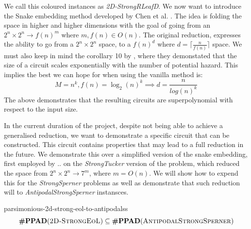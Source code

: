 We call this coloured instances as \textit{2D-StrongRLeafD}. We now want to introduce the Snake embedding method developed by
Chen et al. \cite{chen_SettlingComplexityComputing_2009}. The idea is folding the space in higher and higher dimensions
with the goal of going from an  $2^n \times 2^n \to f(n)^m$  where $m, f(n) \in O(n)$. The original reduction,
expresses the ability to go from a $2^n \times 2^n$ space, to a $f(n)^d$ where $d = \lceil \frac{n}{f(n)} \rceil$ space.
We must also keep in mind the corollary 10 by \cite{ikenmeyer_ComplexityHazardfreeCircuits_2019}, where they demonstated
that the size of a circuit scales exponentially with the number of potential hazard. This implies the best we can hope for
when using the vanilla method is:
$$
    M = n^k, f(n) = \log_2(n)^k \implies d = \frac{n}{log(n)^k}
$$
The above demonstrates that the resulting circuits are superpolynomial with respect to the input size.


In the current duration of the project, despite not being able to achieve a generalised reduction,
we want to demonstrate a specific circuit that can be constructed. This circuit contains properties
that may lead to a full reduction in the future. We demonstrate this over a simplified version
of the snake embedding, first employed by {..} %
on the \textit{StrongTucker} version of the problem, which reduced the space
from $2^n \times 2^n \to 7^m$, where $m = O(n)$. We will show how to expend this
for the \textit{StrongSperner} problems as well as demonstrate that
such reduction will to \textit{AntipodalStrongSperner} instansces.


\begin{theorembox}{}{parsimonious-2d-strong-eol-to-antipodalss}
    $$
        \textbf{\#PPAD}(\textnormal{\textsc{2D-StrongEoL}}) \subseteq \textbf{\#PPAD}(\textnormal{\textsc{AntipodalStrongSperner}})
    $$
\end{theorembox}

